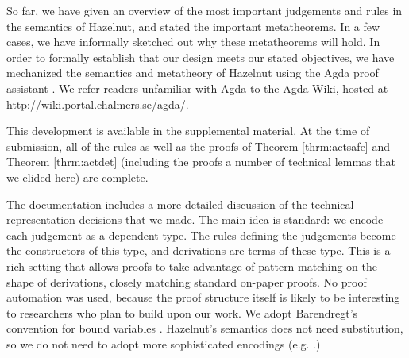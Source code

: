 So far, we have given an overview of the most important judgements and rules in
the semantics of Hazelnut, and stated the important metatheorems. In a few
cases, we have informally sketched out why these metatheorems will hold. In order to formally establish that our design meets our stated objectives, we
have mechanized the semantics and metatheory of Hazelnut using the Agda proof assistant \cite{norell:thesis}. We 
refer readers unfamiliar with Agda to the Agda Wiki, hosted
at \url{http://wiki.portal.chalmers.se/agda/}.

This development is available in the supplemental material. At the time of submission, all of the rules as well as the proofs of Theorem \ref{thrm:actsafe} and Theorem \ref{thrm:actdet} (including the proofs a number of technical lemmas that we elided here) are complete.

The documentation 
includes a more detailed discussion of the technical representation
decisions that we made. The main idea is standard: we encode each judgement as a
dependent type. The rules defining the judgements become the constructors of this
type, and derivations are terms of these type. This is a rich
setting that allows proofs to take advantage of pattern matching on the
shape of derivations, closely matching standard on-paper proofs. No proof automation was used, because the proof structure itself is likely to be interesting to researchers who plan to build upon our work. 
We adopt Barendregt's convention for
bound variables \cite{urban}. Hazelnut's semantics does not need substitution, so we do not need to adopt more sophisticated encodings (e.g. \cite{lh09unibind,Pouillard11}.)
